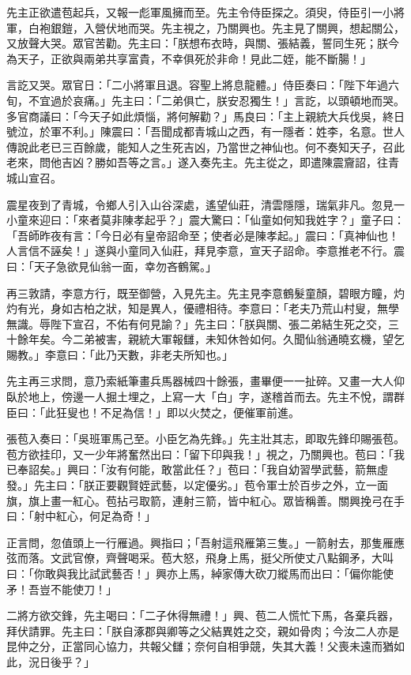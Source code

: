 先主正欲遣苞起兵，又報一彪軍風擁而至。先主令侍臣探之。須臾，侍臣引一小將軍，白袍銀鎧，入營伏地而哭。先主視之，乃關興也。先主見了關興，想起關公，又放聲大哭。眾官苦勸。先主曰：「朕想布衣時，與關、張結義，誓同生死；朕今為天子，正欲與兩弟共享富貴，不幸俱死於非命！見此二姪，能不斷腸！」

言訖又哭。眾官日：「二小將軍且退。容聖上將息龍體。」侍臣奏曰：「陛下年過六旬，不宜過於哀痛。」先主曰：「二弟俱亡，朕安忍獨生！」言訖，以頭頓地而哭。多官商議曰：「今天子如此煩惱，將何解勸？」馬良曰：「主上親統大兵伐吳，終日號泣，於軍不利。」陳震曰：「吾聞成都青城山之西，有一隱者：姓李，名意。世人傳說此老已三百餘歲，能知人之生死吉凶，乃當世之神仙也。何不奏知天子，召此老來，問他吉凶？勝如吾等之言。」遂入奏先主。先主從之，即遣陳震齎詔，往青城山宣召。

震星夜到了青城，令鄉人引入山谷深處，遙望仙莊，清雲隱隱，瑞氣非凡。忽見一小童來迎曰：「來者莫非陳孝起乎？」震大驚曰：「仙童如何知我姓字？」童子曰：「吾師昨夜有言：「今日必有皇帝詔命至；使者必是陳孝起。」震曰：「真神仙也！人言信不誣矣！」遂與小童同入仙莊，拜見李意，宣天子詔命。李意推老不行。震曰：「天子急欲見仙翁一面，幸勿吝鶴駕。」

再三敦請，李意方行，既至御營，入見先主。先主見李意鶴髮童顏，碧眼方瞳，灼灼有光，身如古柏之狀，知是異人，優禮相待。李意曰：「老夫乃荒山村叟，無學無識。辱陛下宣召，不佑有何見諭？」先主曰：「朕與關、張二弟結生死之交，三十餘年矣。今二弟被害，親統大軍報讎，未知休咎如何。久聞仙翁通曉玄機，望乞賜教。」李意曰：「此乃天數，非老夫所知也。」

先主再三求問，意乃索紙筆畫兵馬器械四十餘張，畫畢便一一扯碎。又畫一大人仰臥於地上，傍邊一人掘土埋之，上寫一大「白」字，遂稽首而去。先主不悅，謂群臣曰：「此狂叟也！不足為信！」即以火焚之，便催軍前進。

張苞入奏曰：「吳班軍馬己至。小臣乞為先鋒。」先主壯其志，即取先鋒印賜張苞。苞方欲挂印，又一少年將奮然出曰：「留下印與我！」視之，乃關興也。苞曰：「我已奉詔矣。」興曰：「汝有何能，敢當此任？」苞曰：「我自幼習學武藝，箭無虛發。」先主曰：「朕正要觀賢姪武藝，以定優劣。」苞令軍士於百步之外，立一面旗，旗上畫一紅心。苞拈弓取箭，連射三箭，皆中紅心。眾皆稱善。關興挽弓在手曰：「射中紅心，何足為奇！」

正言問，忽值頭上一行雁過。興指曰；「吾射這飛雁第三隻。」一箭射去，那隻雁應弦而落。文武官僚，齊聲喝采。苞大怒，飛身上馬，挺父所使丈八點鋼矛，大叫曰：「你敢與我比試武藝否！」興亦上馬，綽家傳大砍刀縱馬而出曰：「偏你能使矛！吾豈不能使刀！」

二將方欲交鋒，先主喝曰：「二子休得無禮！」興、苞二人慌忙下馬，各棄兵器，拜伏請罪。先主曰：「朕自涿郡與卿等之父結異姓之交，親如骨肉；今汝二人亦是昆仲之分，正當同心協力，共報父讎；奈何自相爭競，失其大義！父喪未遠而猶如此，況日後乎？」

